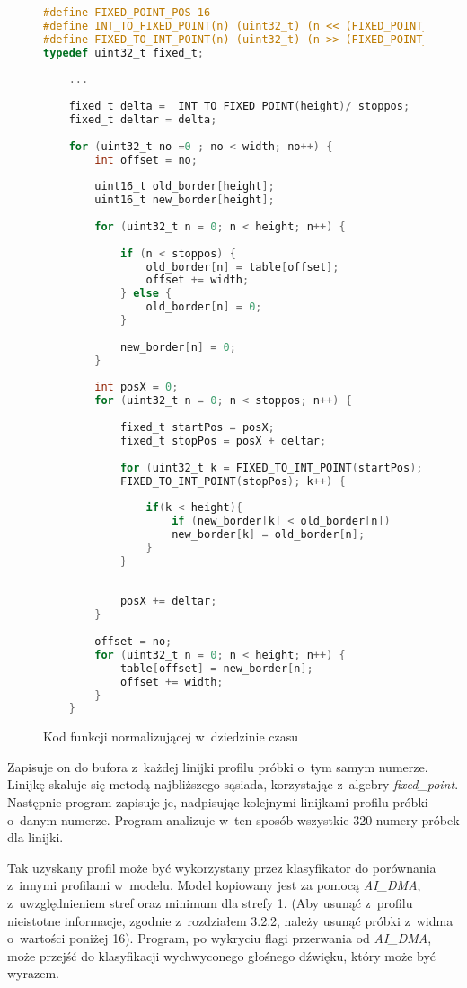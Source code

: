 \begin{figure}[h]
\begin{lstlisting}[language=C]
	
#define FIXED_POINT_POS 16
#define INT_TO_FIXED_POINT(n) (uint32_t) (n << (FIXED_POINT_POS - 1))
#define FIXED_TO_INT_POINT(n) (uint32_t) (n >> (FIXED_POINT_POS - 1))
typedef uint32_t fixed_t;
	
	...
	
	fixed_t delta =  INT_TO_FIXED_POINT(height)/ stoppos;
	fixed_t deltar = delta;
	
	for (uint32_t no =0 ; no < width; no++) {
		int offset = no;
		
		uint16_t old_border[height];
		uint16_t new_border[height];
		
		for (uint32_t n = 0; n < height; n++) {
			
			if (n < stoppos) {
				old_border[n] = table[offset];
				offset += width;
			} else {
				old_border[n] = 0;
			}
			
			new_border[n] = 0;
		}
		
		int posX = 0;
		for (uint32_t n = 0; n < stoppos; n++) {
			
			fixed_t startPos = posX;
			fixed_t stopPos = posX + deltar;
			
			for (uint32_t k = FIXED_TO_INT_POINT(startPos); k <
			FIXED_TO_INT_POINT(stopPos); k++) {
				
				if(k < height){
					if (new_border[k] < old_border[n])
					new_border[k] = old_border[n];
				}
			}
			
			
			posX += deltar;
		}
		
		offset = no;
		for (uint32_t n = 0; n < height; n++) {
			table[offset] = new_border[n];
			offset += width;
		}
	}
\end{lstlisting}
	\caption{Kod funkcji normalizującej w~dziedzinie czasu}
\end{figure}
\FloatBarrier %


Zapisuje on do bufora z~każdej linijki profilu próbki o~tym samym numerze. Linijkę skaluje się metodą najbliższego sąsiada, korzystając z~algebry \textit{fixed\_point}. Następnie program zapisuje je, nadpisując kolejnymi linijkami profilu próbki o~danym numerze. Program analizuje w~ten sposób wszystkie 320 numery próbek dla linijki.

Tak uzyskany profil może być wykorzystany przez klasyfikator do porównania z~innymi profilami w~modelu. Model kopiowany jest za pomocą \textit{AI\_DMA}, z~uwzględnieniem stref oraz minimum dla strefy 1. (Aby usunąć z~profilu nieistotne informacje, zgodnie z~rozdziałem 3.2.2, należy usunąć próbki z~widma o~wartości poniżej 16). Program, po wykryciu flagi przerwania od \textit{AI\_DMA}, może przejść do klasyfikacji wychwyconego głośnego dźwięku, który może być wyrazem.

